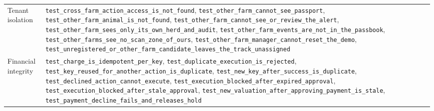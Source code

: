 \documentclass[11pt,letterpaper]{article}
\begin{document}
\begin{table}[H]
\begin{tabularx}{\textwidth}{>{\raggedright\arraybackslash}p{4.2cm}X}
Tenant isolation & \texttt{test\_\allowbreak{}cross\_\allowbreak{}farm\_\allowbreak{}action\_\allowbreak{}access\_\allowbreak{}is\_\allowbreak{}not\_\allowbreak{}found}, \texttt{test\_\allowbreak{}other\_\allowbreak{}farm\_\allowbreak{}cannot\_\allowbreak{}see\_\allowbreak{}passport}, \texttt{test\_\allowbreak{}other\_\allowbreak{}farm\_\allowbreak{}animal\_\allowbreak{}is\_\allowbreak{}not\_\allowbreak{}found}, \texttt{test\_\allowbreak{}other\_\allowbreak{}farm\_\allowbreak{}cannot\_\allowbreak{}see\_\allowbreak{}or\_\allowbreak{}review\_\allowbreak{}the\_\allowbreak{}alert}, \texttt{test\_\allowbreak{}other\_\allowbreak{}farm\_\allowbreak{}sees\_\allowbreak{}only\_\allowbreak{}its\_\allowbreak{}own\_\allowbreak{}herd\_\allowbreak{}and\_\allowbreak{}audit}, \texttt{test\_\allowbreak{}other\_\allowbreak{}farm\_\allowbreak{}events\_\allowbreak{}are\_\allowbreak{}not\_\allowbreak{}in\_\allowbreak{}the\_\allowbreak{}passbook}, \texttt{test\_\allowbreak{}other\_\allowbreak{}farms\_\allowbreak{}see\_\allowbreak{}no\_\allowbreak{}scan\_\allowbreak{}zone\_\allowbreak{}of\_\allowbreak{}ours}, \texttt{test\_\allowbreak{}other\_\allowbreak{}farm\_\allowbreak{}manager\_\allowbreak{}cannot\_\allowbreak{}reset\_\allowbreak{}the\_\allowbreak{}demo}, \texttt{test\_\allowbreak{}unregistered\_\allowbreak{}or\_\allowbreak{}other\_\allowbreak{}farm\_\allowbreak{}candidate\_\allowbreak{}leaves\_\allowbreak{}the\_\allowbreak{}track\_\allowbreak{}unassigned} \\
Financial integrity & \texttt{test\_\allowbreak{}charge\_\allowbreak{}is\_\allowbreak{}idempotent\_\allowbreak{}per\_\allowbreak{}key}, \texttt{test\_\allowbreak{}duplicate\_\allowbreak{}execution\_\allowbreak{}is\_\allowbreak{}rejected}, \texttt{test\_\allowbreak{}key\_\allowbreak{}reused\_\allowbreak{}for\_\allowbreak{}another\_\allowbreak{}action\_\allowbreak{}is\_\allowbreak{}duplicate}, \texttt{test\_\allowbreak{}new\_\allowbreak{}key\_\allowbreak{}after\_\allowbreak{}success\_\allowbreak{}is\_\allowbreak{}duplicate}, \texttt{test\_\allowbreak{}declined\_\allowbreak{}action\_\allowbreak{}cannot\_\allowbreak{}execute}, \texttt{test\_\allowbreak{}execution\_\allowbreak{}blocked\_\allowbreak{}after\_\allowbreak{}expired\_\allowbreak{}approval}, \texttt{test\_\allowbreak{}execution\_\allowbreak{}blocked\_\allowbreak{}after\_\allowbreak{}stale\_\allowbreak{}approval}, \texttt{test\_\allowbreak{}new\_\allowbreak{}valuation\_\allowbreak{}after\_\allowbreak{}approving\_\allowbreak{}payment\_\allowbreak{}is\_\allowbreak{}stale}, \texttt{test\_\allowbreak{}payment\_\allowbreak{}decline\_\allowbreak{}fails\_\allowbreak{}and\_\allowbreak{}releases\_\allowbreak{}hold} \\

\end{tabularx}
\end{table}
\end{document}
